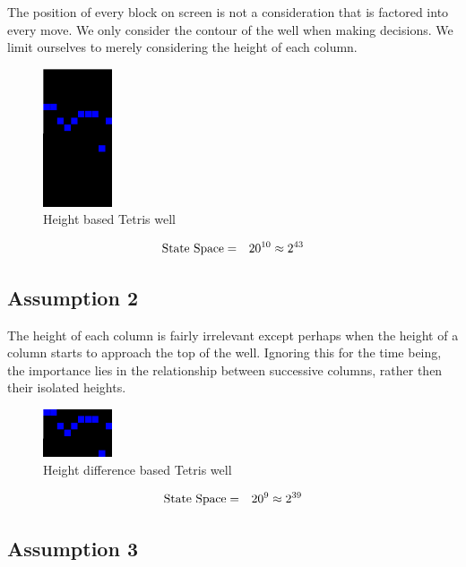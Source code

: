 \documentclass{rucsthesis}
\begin{document}
The position of every block on screen is not a consideration that is factored into every move. We only consider the contour of the well when making decisions. We limit ourselves to merely considering the height of each column.

\begin{figure}[h]
\centering
\includegraphics[width=0.8in]{heightwell.png}
\caption{Height based Tetris well}
\label{fig:heightwell}
\end{figure}

\begin{eqnarray}
\centering
\textrm{State Space} & = & 20^{10} \approx 2^{43}
\end{eqnarray}

\subsection*{Assumption 2}

The height of each column is fairly irrelevant except perhaps when the height of a column starts to approach the top of the well. Ignoring this for the time being, the importance lies in the relationship between successive columns, rather then their isolated heights.

\begin{figure}[h]
\centering
\includegraphics[width=0.8in]{diffheightwell.png}
\caption{Height difference based Tetris well}
\label{fig:diffheightwell}
\end{figure}

\begin{eqnarray}
\centering
\textrm{State Space} & = & 20^{9} \approx 2^{39}
\end{eqnarray}

\subsection*{Assumption 3}
\end{document}
